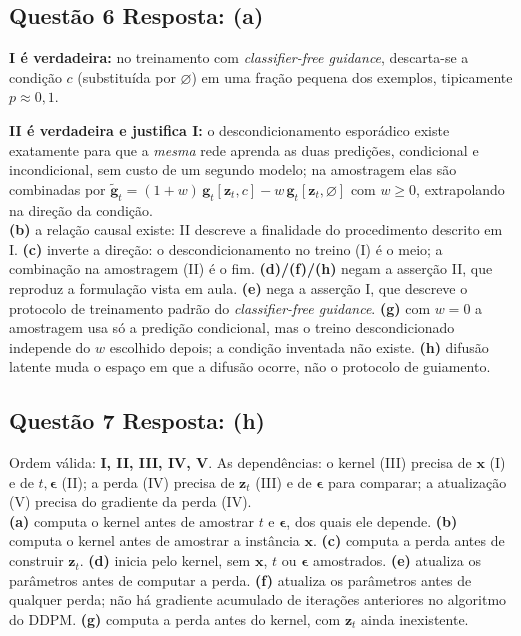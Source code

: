 \documentclass[11pt,a4paper]{article}
\begin{document}
\subsection*{Questão 6 \textemdash{} Resposta: (a)}
\textbf{I é verdadeira:} no treinamento com \textit{classifier-free guidance}, descarta-se a condição $c$ (substituída por $\varnothing$) em uma fração pequena dos exemplos, tipicamente $p \approx 0{,}1$.

\textbf{II é verdadeira e justifica I:} o descondicionamento esporádico existe exatamente para que a \emph{mesma} rede aprenda as duas predições, condicional e incondicional, sem custo de um segundo modelo; na amostragem elas são combinadas por $\tilde{\mathbf{g}}_t = (1+w)\,\mathbf{g}_t[\mathbf{z}_t, c] - w\,\mathbf{g}_t[\mathbf{z}_t, \varnothing]$ com $w \geq 0$, extrapolando na direção da condição.\\
\textbf{(b)} a relação causal existe: II descreve a finalidade do procedimento descrito em I.
\textbf{(c)} inverte a direção: o descondicionamento no treino (I) é o meio; a combinação na amostragem (II) é o fim.
\textbf{(d)/(f)/(h)} negam a asserção II, que reproduz a formulação vista em aula.
\textbf{(e)} nega a asserção I, que descreve o protocolo de treinamento padrão do \textit{classifier-free guidance}.
\textbf{(g)} com $w = 0$ a amostragem usa só a predição condicional, mas o treino descondicionado independe do $w$ escolhido depois; a condição inventada não existe.
\textbf{(h)} difusão latente muda o espaço em que a difusão ocorre, não o protocolo de guiamento.

\subsection*{Questão 7 \textemdash{} Resposta: (h)}
Ordem válida: \textbf{I, II, III, IV, V}. As dependências: o kernel (III) precisa de $\mathbf{x}$ (I) e de $t, \boldsymbol{\epsilon}$ (II); a perda (IV) precisa de $\mathbf{z}_t$ (III) e de $\boldsymbol{\epsilon}$ para comparar; a atualização (V) precisa do gradiente da perda (IV).\\
\textbf{(a)} computa o kernel antes de amostrar $t$ e $\boldsymbol{\epsilon}$, dos quais ele depende.
\textbf{(b)} computa o kernel antes de amostrar a instância $\mathbf{x}$.
\textbf{(c)} computa a perda antes de construir $\mathbf{z}_t$.
\textbf{(d)} inicia pelo kernel, sem $\mathbf{x}$, $t$ ou $\boldsymbol{\epsilon}$ amostrados.
\textbf{(e)} atualiza os parâmetros antes de computar a perda.
\textbf{(f)} atualiza os parâmetros antes de qualquer perda; não há gradiente acumulado de iterações anteriores no algoritmo do DDPM.
\textbf{(g)} computa a perda antes do kernel, com $\mathbf{z}_t$ ainda inexistente.
\end{document}
